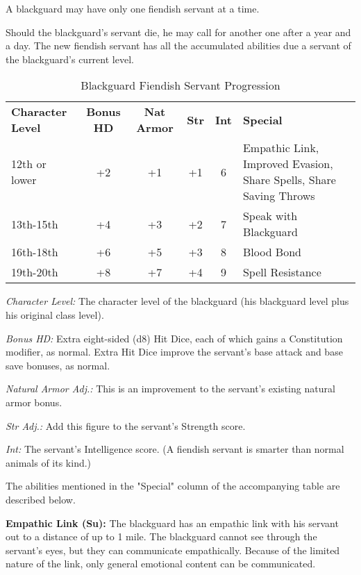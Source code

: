 A blackguard may have only one fiendish servant at a time.

Should the blackguard's servant die, he may call for another one after a year and 
a day. The new fiendish servant has all the accumulated abilities due a servant 
of the blackguard's current level.

\begin{table}[htb]
\caption{Blackguard Fiendish Servant Progression}
\centering
\begin{tabular}{l c c c c p{5cm}}
\textbf{Character Level} & \textbf{Bonus HD} & \textbf{Nat Armor} & \textbf{Str} & \textbf{Int} & \textbf{Special}\\
12th or lower & +2 & +1 & +1 & 6 & Empathic Link, Improved Evasion, Share Spells, Share Saving Throws\\
13th-15th & +4 & +3 & +2 & 7 & Speak with Blackguard\\
16th-18th & +6 & +5 & +3 & 8 & Blood Bond\\
19th-20th & +8 & +7 & +4 & 9 & Spell Resistance\\
\end{tabular}
\end{table}

\textit{Character Level:} The character level of the blackguard (his blackguard 
level plus his original class level).

\textit{Bonus HD:} Extra eight-sided (d8) Hit Dice, each of which gains a Constitution 
modifier, as normal. Extra Hit Dice improve the servant's base attack and base 
save bonuses, as normal.

\textit{Natural Armor Adj.:} This is an improvement to the servant's existing natural 
armor bonus.

\textit{Str Adj.:} Add this figure to the servant's Strength score.

\textit{Int:} The servant's Intelligence score. (A fiendish servant is smarter 
than normal animals of its kind.)

\vspace{12pt}
The abilities mentioned in the "Special" column of the accompanying table are 
described below.

\textbf{Empathic Link (Su):} The blackguard has an empathic link with his servant 
out to a distance of up to 1 mile. The blackguard cannot see through the servant's 
eyes, but they can communicate empathically. Because of the limited nature of the 
link, only general emotional content can be communicated.

